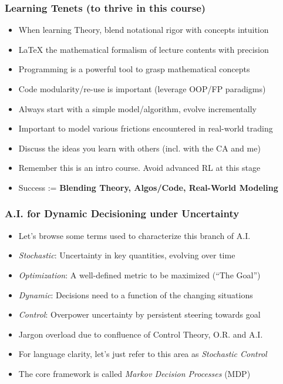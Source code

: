 \documentclass[handout]{beamer}
\begin{document}
\begin{frame}
\frametitle{Learning Tenets (to thrive in this course)}
\pause
\begin{itemize}[<+->]
\item When learning Theory, blend notational rigor with concepts intuition
\item LaTeX the mathematical formalism of lecture contents with precision
\item Programming is a powerful tool to grasp mathematical concepts
\item Code modularity/re-use is important (leverage OOP/FP paradigms)
\item Always start with a simple model/algorithm, evolve incrementally
\item Important to model various frictions encountered in real-world trading
\item Discuss the ideas you learn with others (incl. with the CA and me)
\item Remember this is an intro course. Avoid advanced RL at this stage
\item Success := {\bf Blending Theory, Algos/Code, Real-World Modeling}
\end{itemize}
\end{frame}

\begin{frame}
\frametitle{A.I. for Dynamic Decisioning under Uncertainty}
\pause
\begin{itemize}[<+->]
\item Let's browse some terms used to characterize this branch of A.I.
\item {\em Stochastic}: Uncertainty in key quantities, evolving over time
\item {\em Optimization}: A well-defined metric to be maximized (``The Goal'')
\item {\em Dynamic}:  Decisions need to a function of the changing situations
\item {\em Control}: Overpower uncertainty by persistent steering towards goal
\item Jargon overload due to confluence of Control Theory, O.R. and A.I.
\item For language clarity, let's just refer to this area as {\em Stochastic Control}
\item The core framework is called {\em Markov Decision Processes} (MDP)
\end{itemize}
\end{frame}
\end{document}
